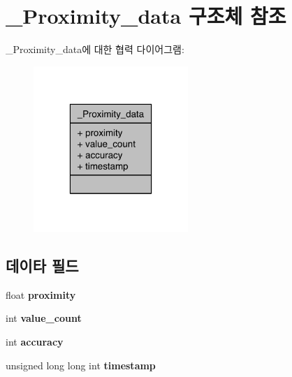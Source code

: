 \hypertarget{struct__Proximity__data}{\section{\-\_\-\-Proximity\-\_\-data 구조체 참조}
\label{struct__Proximity__data}
}


\-\_\-\-Proximity\-\_\-data에 대한 협력 다이어그램\-:\nopagebreak
\begin{figure}[H]
\begin{center}
\leavevmode
\includegraphics[width=166pt]{d6/d50/struct__Proximity__data__coll__graph}
\end{center}
\end{figure}
\subsection*{데이타 필드}
\begin{DoxyCompactItemize}
\item 
\hypertarget{struct__Proximity__data_a5767a762273412ecff24202966e9d67b}{float {\bfseries proximity}}\label{struct__Proximity__data_a5767a762273412ecff24202966e9d67b}

\item 
\hypertarget{struct__Proximity__data_a40a079bfc72408819dc78da308203a74}{int {\bfseries value\-\_\-count}}\label{struct__Proximity__data_a40a079bfc72408819dc78da308203a74}

\item 
\hypertarget{struct__Proximity__data_a5565cf9073275f9713f9016e7c10d25f}{int {\bfseries accuracy}}\label{struct__Proximity__data_a5565cf9073275f9713f9016e7c10d25f}

\item 
\hypertarget{struct__Proximity__data_a8de02c4128636a7bf630ff5428f60c8d}{unsigned long long int {\bfseries timestamp}}\label{struct__Proximity__data_a8de02c4128636a7bf630ff5428f60c8d}

\end{DoxyCompactItemize}


